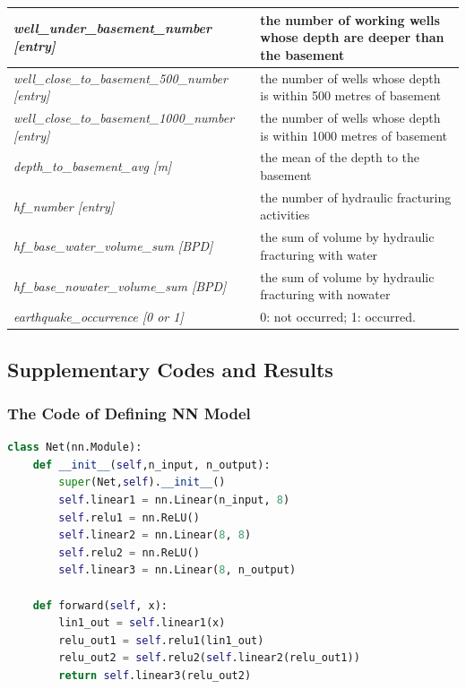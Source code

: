 \documentclass[final-report]{report-template}
\begin{document}
\begin{table}[]
{\begin{tabular}{|l|l|}
    \textit{well\_under\_basement\_number {[}entry{]}}                & the number of working wells whose depth are deeper than the basement   \\ \hline
    \textit{well\_close\_to\_basement\_500\_number {[}entry{]}}       & the number of wells whose depth is within 500 metres of basement       \\ \hline
    \textit{well\_close\_to\_basement\_1000\_number {[}entry{]}}      & the number of wells whose depth is within 1000 metres of basement      \\ \hline
    \textit{depth\_to\_basement\_avg {[}m{]}}                         & the mean of the depth to the basement                                  \\ \hline
    \textit{hf\_number {[}entry{]}}                                   & the number of hydraulic fracturing activities                          \\ \hline
    \textit{hf\_base\_water\_volume\_sum {[}BPD{]}}                   & the sum of volume by hydraulic fracturing with water                   \\ \hline
    \textit{hf\_base\_nowater\_volume\_sum {[}BPD{]}}                 & the sum of volume by hydraulic fracturing with nowater                 \\ \hline
    \textit{earthquake\_occurrence {[}0 or 1{]}}                       & 0: not occurred; 1: occurred.                                          \\ \hline
    \end{tabular}%
    }
    \end{table}

\subsection{Supplementary Codes and Results}
\subsubsection{The Code of Defining NN Model}
\label{sec:NN_code}
\begin{lstlisting}[language=Python]
    class Net(nn.Module):
    def __init__(self,n_input, n_output):
        super(Net,self).__init__()
        self.linear1 = nn.Linear(n_input, 8)
        self.relu1 = nn.ReLU()
        self.linear2 = nn.Linear(8, 8)
        self.relu2 = nn.ReLU()
        self.linear3 = nn.Linear(8, n_output)

    def forward(self, x):
        lin1_out = self.linear1(x)
        relu_out1 = self.relu1(lin1_out)
        relu_out2 = self.relu2(self.linear2(relu_out1))
        return self.linear3(relu_out2)
\end{lstlisting}
\end{document}

